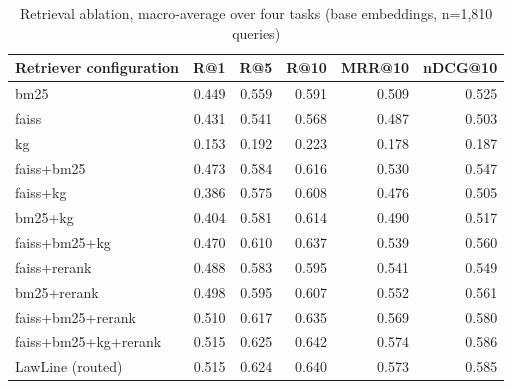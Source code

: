 \begin{table}
\caption{Retrieval ablation, macro-average over four tasks (base embeddings, n=1,810 queries)}
\label{tab:ablation_base}
\begin{tabular}{lrrrrr}
\toprule
Retriever configuration & R@1 & R@5 & R@10 & MRR@10 & nDCG@10 \\
\midrule
bm25 & 0.449 & 0.559 & 0.591 & 0.509 & 0.525 \\
faiss & 0.431 & 0.541 & 0.568 & 0.487 & 0.503 \\
kg & 0.153 & 0.192 & 0.223 & 0.178 & 0.187 \\
faiss+bm25 & 0.473 & 0.584 & 0.616 & 0.530 & 0.547 \\
faiss+kg & 0.386 & 0.575 & 0.608 & 0.476 & 0.505 \\
bm25+kg & 0.404 & 0.581 & 0.614 & 0.490 & 0.517 \\
faiss+bm25+kg & 0.470 & 0.610 & 0.637 & 0.539 & 0.560 \\
faiss+rerank & 0.488 & 0.583 & 0.595 & 0.541 & 0.549 \\
bm25+rerank & 0.498 & 0.595 & 0.607 & 0.552 & 0.561 \\
faiss+bm25+rerank & 0.510 & 0.617 & 0.635 & 0.569 & 0.580 \\
faiss+bm25+kg+rerank & 0.515 & 0.625 & 0.642 & 0.574 & 0.586 \\
LawLine (routed) & 0.515 & 0.624 & 0.640 & 0.573 & 0.585 \\
\bottomrule
\end{tabular}
\end{table}

